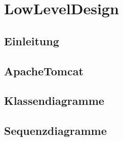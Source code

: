 \documentclass{scrbook}
\begin{document}
\frontmatter
\maketitle
\tableofcontents
\mainmatter

\setcounter{part}{1}
\part{LowLevelDesign}
\chapter*{Einleitung}

\chapter{ApacheTomcat}
 
\chapter{Klassendiagramme}

\chapter{Sequenzdiagramme}

\end{document}
